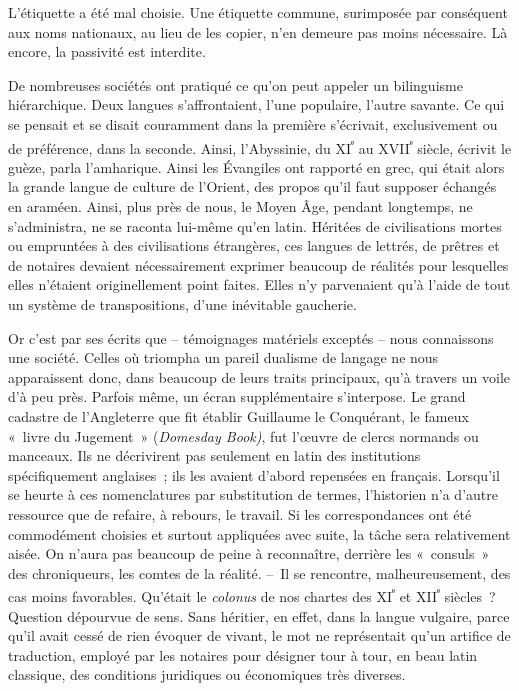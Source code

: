 \documentclass[french,twoside]{book} %
\newcommand{\astermono}{\medskip\centerline{\color{rubric}\large\selectfont{\syms ✻}}\medskip\par}%
\begin{document}
L’étiquette a été mal choisie. Une étiquette commune, surimposée par conséquent aux noms nationaux, au lieu de les copier, n’en demeure pas moins nécessaire. Là encore, la passivité est interdite.\par

\astermono

\noindent De nombreuses sociétés ont pratiqué ce qu’on peut appeler un bilin­guisme hiérarchique. Deux langues s’affrontaient, l’une populaire, l’autre savante. Ce qui se pensait et se disait couramment dans la première s’écrivait, exclusivement ou de préférence, dans la seconde. Ainsi, l’Abys­sinie, du XI\textsuperscript{ᵉ} au XVII\textsuperscript{ᵉ} siècle, écrivit le guèze, parla l’amharique. Ainsi les Évangiles ont rapporté en grec, qui était alors la grande langue de culture de l’Orient, des propos qu’il faut supposer échangés en araméen. Ainsi, plus près de nous, le Moyen Âge, pendant longtemps, ne s’administra, ne se raconta lui-même qu’en latin. Héritées de civilisations mortes ou empruntées à des civilisations étrangères, ces langues de lettrés, de prêtres et de notaires devaient nécessairement exprimer beaucoup de réalités pour lesquelles elles n’étaient originellement point faites. Elles n’y par­venaient qu’à l’aide de tout un système de transpositions, d’une inévi­table gaucherie.\par
Or c’est par ses écrits que – témoignages matériels exceptés – nous connaissons une société. Celles où triompha un pareil dualisme de langage ne nous apparaissent donc, dans beaucoup de leurs traits principaux, qu’à travers un voile d’à peu près. Parfois même, un écran supplémentaire s’interpose. Le grand cadastre de l’Angleterre que fit établir Guillaume le Conquérant, le fameux « livre du Jugement » (\emph{Domesday Book)}, fut l’œuvre de clercs normands ou manceaux. Ils ne décrivirent pas seulement en latin des institutions spécifiquement anglaises ; ils les avaient d’abord repensées en français. Lorsqu’il se heurte à ces nomenclatures par substi­tution de termes, l’historien n’a d’autre ressource que de refaire, à rebours,  
\label{p84} le travail. Si les correspondances ont été commodément choisies et surtout appliquées avec suite, la tâche sera relativement aisée. On n’aura pas beaucoup de peine à reconnaître, derrière les « consuls » des chroniqueurs, les comtes de la réalité. – Il se rencontre, malheureusement, des cas moins favorables. Qu’était le \emph{colonus} de nos chartes des XI\textsuperscript{ᵉ} et XII\textsuperscript{ᵉ} siècles ? Question dépourvue de sens. Sans héritier, en effet, dans la langue vulgaire, parce qu’il avait cessé de rien évoquer de vivant, le mot ne représentait qu’un artifice de traduction, employé par les notaires pour désigner tour à tour, en beau latin classique, des conditions juridiques ou économiques très diverses.\par
\end{document}
